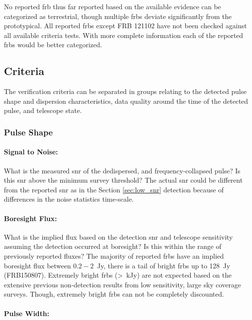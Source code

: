 \documentclass[a4paper,fleqn,usenatbib]{mnras}
\begin{document}
No reported \gls{frb} thus far reported based on the available evidence can be
categorized as terrestrial, though multiple \glspl{frb} deviate significantly
from the prototypical. All reported \glspl{frb} except FRB 121102 have not been
checked against all available criteria tests. With more complete information
each of the reported \glspl{frb} would be better categorized.

\subsection{Criteria}

The verification criteria can be separated in groups relating to the detected
pulse shape and dispersion characteristics, data quality around the time of the
detected pulse, and telescope state.

\subsubsection{Pulse Shape}

\paragraph{Signal to Noise:}

What is the measured \gls{snr} of the dedispersed, and frequency-collapsed pulse?
Is this \gls{snr} above the minimum survey threshold? The actual \gls{snr} could
be different from the reported \gls{snr} as in the Section \ref{sec:low_snr}
detection because of differences in the noise statistics time-scale.

\paragraph{Boresight Flux:}

What is the implied flux based on the detection \gls{snr} and telescope
sensitivity assuming the detection occurred at boresight? Is this within the
range of previously reported fluxes? The majority of reported \glspl{frb} have
an implied boresight flux between $0.2-2$~Jy, there is a tail of bright
\glspl{frb} up to 128~Jy (FRB150807). Extremely bright \glspl{frb} (>~kJy) are
not expected based on the extensive previous non-detection results from low
sensitivity, large sky coverage surveys. Though, extremely bright \glspl{frb}
can not be completely discounted.

\paragraph{Pulse Width:}
\end{document}
